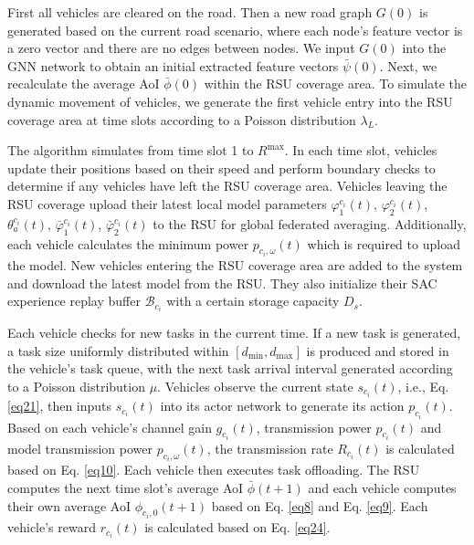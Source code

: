 \documentclass[lettersize,journal,onecolumn]{IEEEtran}
\begin{document}
First  all vehicles  are cleared on the road. Then a new road graph $G(0)$ is generated based on the current road scenario, where each node's feature vector is a zero vector and there are no edges between nodes. We input $G(0)$ into the GNN network to obtain an initial  extracted feature vectors $\bar{\psi }\left( 0 \right)$. Next, we recalculate the average AoI $\bar{\phi }(0)$ within the RSU coverage area. To simulate the dynamic movement of vehicles, we generate the first vehicle entry into the RSU coverage area at time slots according to a Poisson distribution ${{\lambda }_{L}}$.

The algorithm simulates from time slot 1 to $R^{\max}$. In each time slot, vehicles update their positions based on their speed and perform boundary checks to determine if any vehicles have left the RSU coverage area. Vehicles leaving the RSU coverage upload their latest local model parameters $\varphi _{1}^{{{c}_{i}}}(t)$, $\varphi _{2}^{{{c}_{i}}}(t)$, $\theta _{a}^{{{c}_{i}}}(t)$, $\bar{\varphi }_{1}^{{{c}_{i}}}(t)$, $\bar{\varphi }_{2}^{{{c}_{i}}}(t)$ to the RSU for global federated averaging. Additionally, each vehicle calculates the minimum power ${{p}_{{{{c}}_{i}},\omega }}(t)$ which is required to upload the model. New vehicles entering the RSU coverage area are added to the system and download the latest model from the RSU. They also initialize their SAC experience replay buffer ${{\mathcal{B}}_{{{c}_{i}}}}$ with a certain storage capacity ${{D}_{s}}$.

Each vehicle checks for new tasks in the current time. If a new task is generated, a task size uniformly distributed within $[{{d}_{\min }},{{d}_{\max }}]$ is produced and stored in the vehicle's task queue, with the next task arrival interval generated according to a Poisson distribution $\mu $. Vehicles observe the current state ${{s}_{{{c}_{i}}}}(t)$, i.e., Eq. \eqref{eq21}, then inputs ${{s}_{{{c}_{i}}}}(t)$ into its actor network to generate its action ${{p}_{{{c}_{i}}}}(t)$. Based on each vehicle's channel gain ${{g}_{{{c}_{i}}}}\left( t \right)$, transmission power ${{p}_{{{c}_{i}}}}(t)$ and model transmission power ${{p}_{{{{c}}_{i}},\omega }}(t)$, the transmission rate ${{R}_{{{{c}}_{i}}}}(t)$ is calculated based on Eq. \eqref{eq10}. Each vehicle then executes task offloading. The RSU computes the next time slot's average AoI $\bar{\phi }(t+1)$ and each vehicle computes their own average AoI ${{\phi }_{{{{c}}_{i}},0}}\left( t+1 \right)$ based on Eq. \eqref{eq8} and Eq. \eqref{eq9}. Each vehicle's reward ${{r}_{{{c}_{i}}}}(t)$ is calculated based on Eq. \eqref{eq24}.
\end{document}
